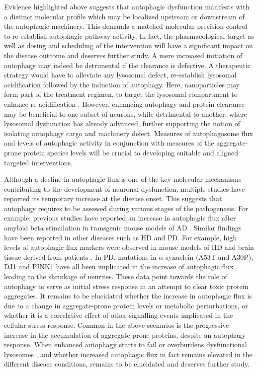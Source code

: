 Evidence highlighted above suggests that autophagic dysfunction manifests with a distinct molecular profile which may be localized upstream or downstream of the autophagic machinery. This demands a matched molecular precision control to re-establish autophagic pathway activity. In fact, the pharmacological target as well as dosing and scheduling of the intervention will have a significant impact on the disease outcome and deserves further study. A mere increased initiation of autophagy may indeed be detrimental if the clearance is defective. A therapeutic strategy would have to alleviate any lysosomal defect, re-establish lysosomal acidification followed by the induction of autophagy. Here, nanoparticles may form part of the treatment regimen, to target the lysosomal compartment to enhance re-acidification \citep{Peynshaert2014}. However, enhancing autophagy and protein clearance may be beneficial to one subset of neurons, while detrimental to another, where lysosomal dysfunction has already advanced, further supporting the notion of isolating autophagy cargo and machinery defect. Measures of autophagosome flux \citep{loos2014} and levels of autophagic activity \citep{Kaizuka2016} in conjunction with measures of the aggregate-prone protein species levels will be crucial to developing suitable and aligned targeted interventions.

Although a decline in autophagic flux is one of the key molecular mechanisms contributing to the development of neuronal dysfunction, multiple studies have reported its temporary increase at the disease onset. This suggests that autophagy requires to be assessed during various stages of the pathogenesis. For example, previous studies have reported an increase in autophagic flux after amyloid beta stimulation in transgenic mouse models of AD \citep{Hung2009,Wang2010a,Wang2010b,Yu2005}. Similar findings have been reported in other diseases such as HD and PD. For example, high levels of autophagic flux markers were observed in mouse models of HD and brain tissue derived from patients \citep{Heng2010,Nagata2004,Ravikumar2004}. In PD, mutations in $\alpha$-synuclein (A53T and A30P), DJ1 and PINK1 have all been implicated in the increase of autophagic flux \citep{Irrcher2010,Michiorri2010,Plowey2008,Stefanis2001}, leading to the shrinkage of neurites. These data point towards the role of autophagy to serve as initial stress response \citep{Loos2009} in an attempt to clear toxic protein aggregates. It remains to be elucidated whether the increase in autophagic flux is due to a change in aggregate-prone protein levels or metabolic perturbations, or whether it is a correlative effect of other signalling events implicated in the cellular stress response. Common in the above scenarios is the progressive increase in the accumulation of aggregate-prone proteins, despite an autophagy response. When enhanced autophagy starts to fail or overburdens dysfunctional lysosomes \citep{Bordi2016}, and whether increased autophagic flux in fact remains elevated in the different disease conditions, remains to be elucidated and deserves further study.

